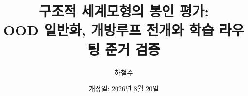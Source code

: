 \documentclass[11pt]{article}
\title{구조적 세계모형의 봉인 평가:\\
OOD 일반화, 개방루프 전개와 학습 라우팅 준거 검증}
\author{하철수}
\date{개정일: 2026년 8월 20일}
\theoremstyle{definition}
\begin{document}
\maketitle













\begingroup
\raggedright


\endgroup
\end{document}
